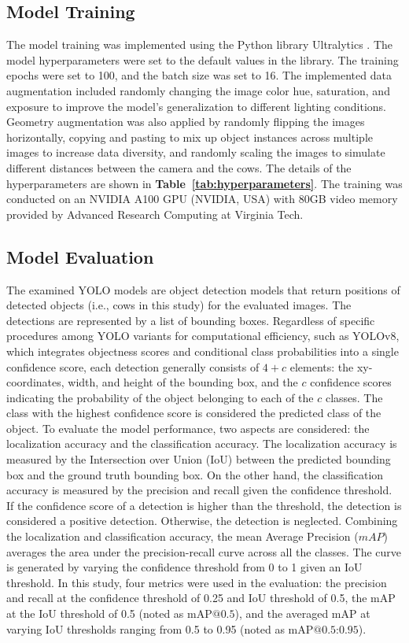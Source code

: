 \subsection{Model Training}
The model training was implemented using the Python library Ultralytics \cite{ultralytics}. The model hyperparameters were set to the default values in the library. The training epochs were set to 100, and the batch size was set to 16. The implemented data augmentation included randomly changing the image color hue, saturation, and exposure to improve the model's generalization to different lighting conditions. Geometry augmentation was also applied by randomly flipping the images horizontally, copying and pasting to mix up object instances across multiple images to increase data diversity, and randomly scaling the images to simulate different distances between the camera and the cows. The details of the hyperparameters are shown in \textbf{Table~\ref{tab:hyperparameters}}. The training was conducted on an NVIDIA A100 GPU (NVIDIA, USA) with 80GB video memory provided by Advanced Research Computing at Virginia Tech.

\subsection{Model Evaluation}
The examined YOLO models are object detection models that return positions of detected objects (i.e., cows in this study) for the evaluated images. The detections are represented by a list of bounding boxes. Regardless of specific procedures among YOLO variants for computational efficiency, such as YOLOv8, which integrates objectness scores and conditional class probabilities into a single confidence score, each detection generally consists of $4+c$ elements: the xy-coordinates, width, and height of the bounding box, and the $c$ confidence scores indicating the probability of the object belonging to each of the $c$ classes. The class with the highest confidence score is considered the predicted class of the object. To evaluate the model performance, two aspects are considered: the localization accuracy and the classification accuracy. The localization accuracy is measured by the Intersection over Union (IoU) between the predicted bounding box and the ground truth bounding box. On the other hand, the classification accuracy is measured by the precision and recall given the confidence threshold. If the confidence score of a detection is higher than the threshold, the detection is considered a positive detection. Otherwise, the detection is neglected. Combining the localization and classification accuracy, the mean Average Precision ($mAP$) averages the area under the precision-recall curve across all the classes. The curve is generated by varying the confidence threshold from 0 to 1 given an IoU threshold. In this study, four metrics were used in the evaluation: the precision and recall at the confidence threshold of 0.25 and IoU threshold of 0.5, the mAP at the IoU threshold of 0.5 (noted as $\text{mAP@{0.5}}$), and the averaged mAP at varying IoU thresholds ranging from 0.5 to 0.95 (noted as $\text{mAP@{0.5:0.95}}$).

